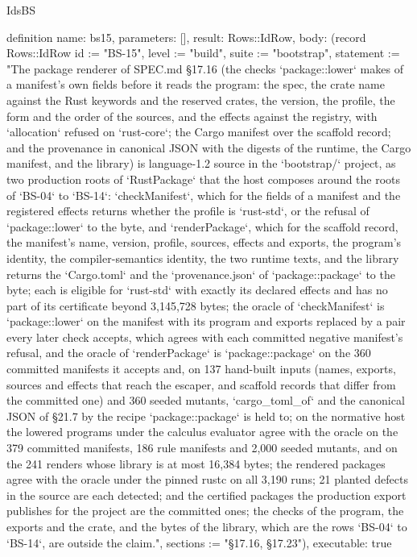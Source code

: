\begin{lexlean}{IdsBS}
\begin{semanticmodule}
definition{
  name: bs15,
  parameters: [],
  result: Rows::IdRow,
  body: (record Rows::IdRow {id := "BS-15", level := "build", suite := "bootstrap", statement := "The package renderer of SPEC.md §17.16 (the checks `package::lower` makes of a manifest's own fields before it reads the program: the spec, the crate name against the Rust keywords and the reserved crates, the version, the profile, the form and the order of the sources, and the effects against the registry, with `allocation` refused on `rust-core`; the Cargo manifest over the scaffold record; and the provenance in canonical JSON with the digests of the runtime, the Cargo manifest, and the library) is language-1.2 source in the `bootstrap/` project, as two production roots of `RustPackage` that the host composes around the roots of `BS-04` to `BS-14`: `checkManifest`, which for the fields of a manifest and the registered effects returns whether the profile is `rust-std`, or the refusal of `package::lower` to the byte, and `renderPackage`, which for the scaffold record, the manifest's name, version, profile, sources, effects and exports, the program's identity, the compiler-semantics identity, the two runtime texts, and the library returns the `Cargo.toml` and the `provenance.json` of `package::package` to the byte; each is eligible for `rust-std` with exactly its declared effects and has no part of its certificate beyond 3,145,728 bytes; the oracle of `checkManifest` is `package::lower` on the manifest with its program and exports replaced by a pair every later check accepts, which agrees with each committed negative manifest's refusal, and the oracle of `renderPackage` is `package::package` on the 360 committed manifests it accepts and, on 137 hand-built inputs (names, exports, sources and effects that reach the escaper, and scaffold records that differ from the committed one) and 360 seeded mutants, `cargo_toml_of` and the canonical JSON of §21.7 by the recipe `package::package` is held to; on the normative host the lowered programs under the calculus evaluator agree with the oracle on the 379 committed manifests, 186 rule manifests and 2,000 seeded mutants, and on the 241 renders whose library is at most 16,384 bytes; the rendered packages agree with the oracle under the pinned rustc on all 3,190 runs; 21 planted defects in the source are each detected; and the certified packages the production export publishes for the project are the committed ones; the checks of the program, the exports and the crate, and the bytes of the library, which are the rows `BS-04` to `BS-14`, are outside the claim.", sections := "§17.16, §17.23"}),
  executable: true
}


\end{semanticmodule}
\end{lexlean}
